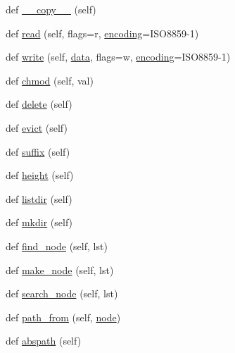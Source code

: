\begin{DoxyCompactItemize}
\item 
def \hyperlink{classwaflib_1_1_node_1_1_node_ac6b216662a82357074bf7508a313ac06}{\+\_\+\+\_\+copy\+\_\+\+\_\+} (self)
\item 
def \hyperlink{classwaflib_1_1_node_1_1_node_a05c37e221931a32e74bd11e2dbb38431}{read} (self, flags=\textquotesingle{}r\textquotesingle{}, \hyperlink{structencoding}{encoding}=\textquotesingle{}I\+S\+O8859-\/1\textquotesingle{})
\item 
def \hyperlink{classwaflib_1_1_node_1_1_node_a3e2f255b6614d98ff3f73903cc1a0439}{write} (self, \hyperlink{lib_2expat_8h_ac39e72a1de1cb50dbdc54b08d0432a24}{data}, flags=\textquotesingle{}w\textquotesingle{}, \hyperlink{structencoding}{encoding}=\textquotesingle{}I\+S\+O8859-\/1\textquotesingle{})
\item 
def \hyperlink{classwaflib_1_1_node_1_1_node_a7c69c9ee890bc2113f4f44c8b6d0aed5}{chmod} (self, val)
\item 
def \hyperlink{classwaflib_1_1_node_1_1_node_a5b15f6a29b5158a010fc78e7d2a4eef8}{delete} (self)
\item 
def \hyperlink{classwaflib_1_1_node_1_1_node_a31ebb3fd3aee8086605111ce83122453}{evict} (self)
\item 
def \hyperlink{classwaflib_1_1_node_1_1_node_a08a86be308b4ea7e209571274504852a}{suffix} (self)
\item 
def \hyperlink{classwaflib_1_1_node_1_1_node_a6f41a0f58447b1e67c4e4826e718f853}{height} (self)
\item 
def \hyperlink{classwaflib_1_1_node_1_1_node_a70c5530ee0dc91ddd80178d039c04d94}{listdir} (self)
\item 
def \hyperlink{classwaflib_1_1_node_1_1_node_a93340e13646660f3835b0c11e133bb64}{mkdir} (self)
\item 
def \hyperlink{classwaflib_1_1_node_1_1_node_a9ab508cb5f7d7069e8575d4d660c8379}{find\+\_\+node} (self, lst)
\item 
def \hyperlink{classwaflib_1_1_node_1_1_node_a347043d52fc2dee925ef027973e01134}{make\+\_\+node} (self, lst)
\item 
def \hyperlink{classwaflib_1_1_node_1_1_node_a67385f1721014aa606e2d7b25687a40f}{search\+\_\+node} (self, lst)
\item 
def \hyperlink{classwaflib_1_1_node_1_1_node_a2994cfc8043e1f27b8873e340a885788}{path\+\_\+from} (self, \hyperlink{structnode}{node})
\item 
def \hyperlink{classwaflib_1_1_node_1_1_node_aa0164267912895aeb986fdbfcf945159}{abspath} (self)
\item 

\end{DoxyCompactItemize}
